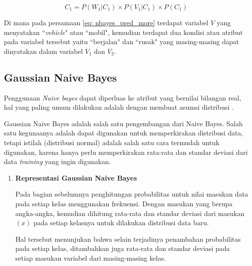 \begin{subs}
\begin{enumerate}[label=\textbf{\arabic*).}]
		\begin{equation}
			\label{eq: nbayes_pred_more}
			C_{1} = P(W_{1}|C_{1}) \times P(V_{1}|C_{1}) \times P(C_{1})
		\end{equation}
	
		Di mana pada persamaan \ref{eq: nbayes_pred_more} terdapat variabel $V$ yang menyatakan ``\textit{vehicle}" atau ``mobil", kemudian terdapat dua kondisi atau atribut pada variabel tersebut yaitu ``berjalan" dan ``rusak" yang masing-masing dapat dinyatakan dalam variabel $V_{1}$ dan $V_{2}$.
		\vspace{1ex}
	\end{enumerate}
	
	\subsection{Gaussian Naive Bayes}
	\label{sec:sub_sec2_gauss_bayes}
	\vspace{1ex}
	
	Penggunaan \textit{Naive bayes} dapat diperluas ke atribut yang bernilai bilangan real, hal yang paling umum dilakukan adalah dengan membuat asumsi distribusi .
	\vspace{1ex}
	
	Gaussian Naive Bayes adalah salah satu pengembangan dari Naive Bayes. Salah satu kegunaanya adalah dapat digunakan untuk memperkirakan distribusi data, tetapi istilah  (distribusi normal) adalah salah satu cara termudah untuk digunakan, karena hanya perlu memperkirakan rata-rata dan standar deviasi dari data \textit{training} yang ingin digunakan.
	\vspace{1ex}
	
	\begin{enumerate}[label=\textbf{\arabic*).}]
		
		\item \textbf{Representasi Gaussian Naive Bayes}
		\setlength{\parindent}{0.8cm}
	
		Pada bagian sebelumnya penghitungan probabilitas untuk nilai masukan data pada setiap kelas menggunakan frekuensi. Dengan masukan yang berupa angka-angka, kemudian dihitung rata-rata dan standar deviasi dari masukan $(x)$ pada setiap kelasnya untuk dilakukan distribusi data baru.
		\vspace{1ex}
		
		Hal tersebut menunjukan bahwa selain terjadinya penambahan probabilitas pada setiap kelas, ditambahkan juga rata-rata dan standar deviasi pada setiap masukan variabel dari masing-masing kelas.
	

\end{enumerate}
\end{subs}
